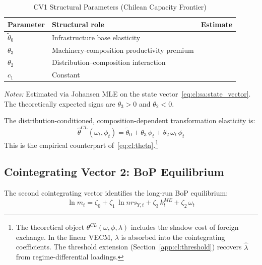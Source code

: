 \begin{table}[htbp]
	\centering
	\caption{CV1 Structural Parameters (Chilean Capacity Frontier)}
	\label{tab:cl:sa:cv1_params}
	\begin{threeparttable}
		\begin{tabular}{llr}
			\toprule
			Parameter & Structural role & Estimate \\
			\midrule
			$\tilde{\theta}_0$ & Infrastructure base elasticity &  \\
			$\theta_3$ & Machinery-composition productivity premium &  \\
			$\theta_2$ & Distribution--composition interaction &  \\
			$c_1$ & Constant &  \\
			\bottomrule
		\end{tabular}
		\begin{tablenotes}
			\small
			\item \textit{Notes:} Estimated via Johansen MLE on the state
			vector~\eqref{eq:cl:sa:state_vector}. The theoretically expected
			signs are $\theta_3 > 0$ and $\theta_2 < 0$.
		\end{tablenotes}
	\end{threeparttable}
\end{table}

The distribution-conditioned, composition-dependent transformation
elasticity is:
%
\begin{equation}
	\hat{\theta}^{CL}(\omega_t,\phi_t)
	= \tilde{\theta}_0 + \theta_3\,\phi_t
	+ \theta_2\,\omega_t\,\phi_t
	\label{eq:cl:sa:theta}
\end{equation}
%
This is the empirical counterpart of~\eqref{eq:cl:theta}.\footnote{The
	theoretical object $\theta^{CL}(\omega,\phi,\lambda)$ includes the shadow
	cost of foreign exchange. In the linear VECM, $\lambda$ is absorbed into
	the cointegrating coefficients. The threshold extension
	(Section~\ref{app:cl:threshold}) recovers $\hat{\lambda}$ from
	regime-differential loadings.}

\subsection{Cointegrating Vector 2: BoP Equilibrium}
\label{app:cl:cv2}

The second cointegrating vector identifies the long-run BoP
equilibrium:
%
\begin{equation}
\ln m_t = \zeta_0
+ \zeta_1\, \ln nrs_{Y,t}
+ \zeta_3\, k_t^{ME}
+ \zeta_2\, \omega_t
\label{eq:cl:sa:cv2}
\end{equation}

